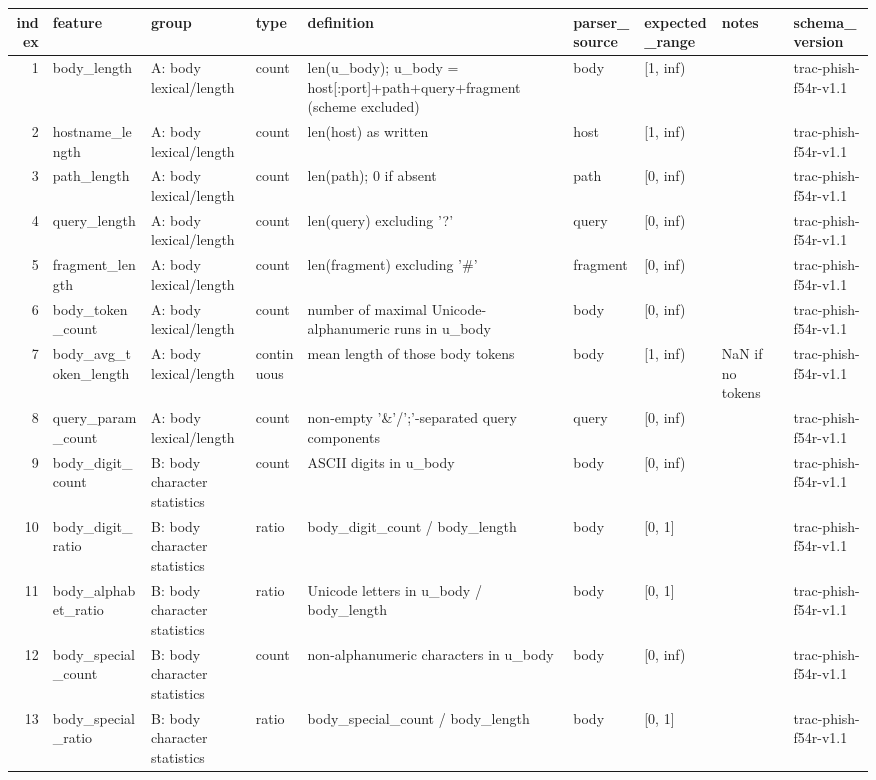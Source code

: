 \begin{tabular}{rllllllll}
\toprule
index & feature & group & type & definition & parser\_source & expected\_range & notes & schema\_version \\
\midrule
1 & body\_length & A: body lexical/length & count & len(u\_body); u\_body = host[:port]+path+query+fragment (scheme excluded) & body & [1, inf) &  & trac-phish-f54r-v1.1 \\
2 & hostname\_length & A: body lexical/length & count & len(host) as written & host & [1, inf) &  & trac-phish-f54r-v1.1 \\
3 & path\_length & A: body lexical/length & count & len(path); 0 if absent & path & [0, inf) &  & trac-phish-f54r-v1.1 \\
4 & query\_length & A: body lexical/length & count & len(query) excluding '?' & query & [0, inf) &  & trac-phish-f54r-v1.1 \\
5 & fragment\_length & A: body lexical/length & count & len(fragment) excluding '\#' & fragment & [0, inf) &  & trac-phish-f54r-v1.1 \\
6 & body\_token\_count & A: body lexical/length & count & number of maximal Unicode-alphanumeric runs in u\_body & body & [0, inf) &  & trac-phish-f54r-v1.1 \\
7 & body\_avg\_token\_length & A: body lexical/length & continuous & mean length of those body tokens & body & [1, inf) & NaN if no tokens & trac-phish-f54r-v1.1 \\
8 & query\_param\_count & A: body lexical/length & count & non-empty '\&'/';'-separated query components & query & [0, inf) &  & trac-phish-f54r-v1.1 \\
9 & body\_digit\_count & B: body character statistics & count & ASCII digits in u\_body & body & [0, inf) &  & trac-phish-f54r-v1.1 \\
10 & body\_digit\_ratio & B: body character statistics & ratio & body\_digit\_count / body\_length & body & [0, 1] &  & trac-phish-f54r-v1.1 \\
11 & body\_alphabet\_ratio & B: body character statistics & ratio & Unicode letters in u\_body / body\_length & body & [0, 1] &  & trac-phish-f54r-v1.1 \\
12 & body\_special\_count & B: body character statistics & count & non-alphanumeric characters in u\_body & body & [0, inf) &  & trac-phish-f54r-v1.1 \\
13 & body\_special\_ratio & B: body character statistics & ratio & body\_special\_count / body\_length & body & [0, 1] &  & trac-phish-f54r-v1.1 \\

\end{tabular}
